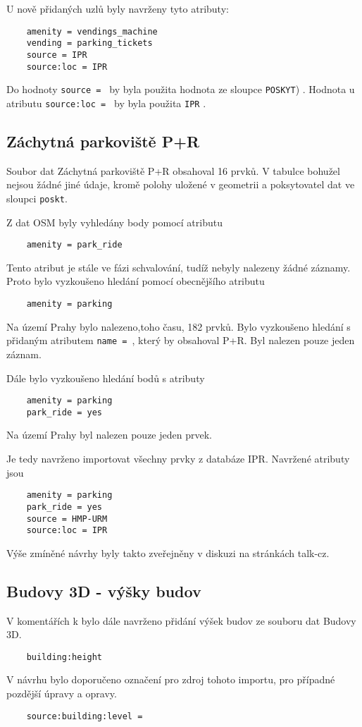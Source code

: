 U nově přidaných uzlů byly navrženy tyto atributy:
\begin{verbatim}
    amenity = vendings_machine
    vending = parking_tickets
    source = IPR
    source:loc = IPR
\end{verbatim}
Do hodnoty {\tt source~= } by byla použita hodnota ze sloupce {\tt POSKYT}) .
Hodnota u atributu {\tt source:loc~= } by byla použita {\tt IPR} .

\subsection{Záchytná parkoviště P+R}
\label{Záchytná parkoviště P+R}
Soubor dat Záchytná parkoviště P+R obsahoval 16 prvků.
V tabulce bohužel nejsou žádné jiné údaje, kromě polohy uložené v geometrii
a poksytovatel dat ve sloupci {\tt poskt}.

Z dat OSM byly vyhledány body pomocí atributu
\begin{verbatim}
    amenity = park_ride
\end{verbatim}
Tento atribut je stále ve fázi schvalování, tudíž nebyly nalezeny žádné záznamy.
Proto bylo vyzkoušeno hledání pomocí obecnějšího atributu
\begin{verbatim}
    amenity = parking
\end{verbatim}
Na území Prahy bylo nalezeno,toho času, 182 prvků.
Bylo vyzkoušeno hledání s přidaným atributem {\tt name~= }, který by obsahoval P+R.
Byl nalezen pouze jeden záznam.

Dále bylo vyzkoušeno hledání bodů s atributy 
\begin{verbatim}
    amenity = parking
    park_ride = yes
\end{verbatim}
Na území Prahy byl nalezen pouze jeden prvek.

Je tedy navrženo importovat všechny prvky z databáze IPR.
Navržené atributy jsou
\begin{verbatim}
    amenity = parking
    park_ride = yes
    source = HMP-URM
    source:loc = IPR
\end{verbatim}


Výše zmíněné návrhy byly takto zveřejněny v diskuzi na stránkách talk-cz.

\subsection{Budovy 3D - výšky budov}
\label{Budovy 3D - výšky budov}
V komentářích k bylo dále navrženo přidání výšek budov ze souboru dat Budovy 3D.
\begin{verbatim}
    building:height
\end{verbatim}
V návrhu bylo doporučeno označení pro zdroj tohoto importu, pro případné pozdější úpravy a opravy.
\begin{verbatim}
    source:building:level =
\end{verbatim}

